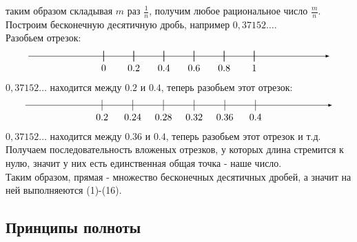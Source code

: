 \documentclass[a4paper, 12pt]{article}
\theoremstyle{definition}
\begin{document}
        таким образом складывая $m$ раз $\frac{1}{n}$, получим любое рациональное число $\frac{m}{n}$.\\
        Построим бесконечную десятичную дробь, например $0,37152\dots$.\\
        Разобьем отрезок:
        \[\begin{tikzpicture} [scale=5.5]
        \draw[-latex] (-0.5,0) -- (1.5,0) ;
        \foreach \x in {0,0.2,0.4,0.6,0.8,1}
        \draw[shift={(\x,0)},color=black] (0pt,1pt) -- (0pt,-1pt);
        \foreach \x in {0,0.2,0.4,0.6,0.8,1}
        \draw[shift={(\x,0)},color=black] (0pt,1pt) -- (0pt,-1pt) node[below] 
        {$\x$};
        \end{tikzpicture}\]
        $0,37152\dots$ находится между $0.2$ и $0.4$, теперь разобьем этот отрезок:
        \[\begin{tikzpicture} [scale=28]
        \draw[-latex] (0.1,0) -- (0.5,0) ;
        \foreach \x in {0.2,0.24,0.28,0.32,0.36,0.4}
        \draw[shift={(\x,0)},color=black] (0pt,0.2pt) -- (0pt,0.2pt);
        \foreach \x in {0.2,0.24,0.28,0.32,0.36,0.4}
        \draw[shift={(\x,0)},color=black] (0pt,0.2pt) -- (0pt,-0.2pt) node[below] 
        {$\x$};
        \end{tikzpicture}\]
        $0,37152\dots$ находится между $0.36$ и $0.4$, теперь разобьем этот отрезок и т.д.
        Получаем последовательность вложеных отрезков, у которых длина стремится к нулю, значит у них есть единственная общая точка - наше число.\\
        Таким образом, прямая - множество бесконечных десятичных дробей, а значит на ней выполняеются (1)-(16).
        \subsection{Принципы полноты}
\end{document}
